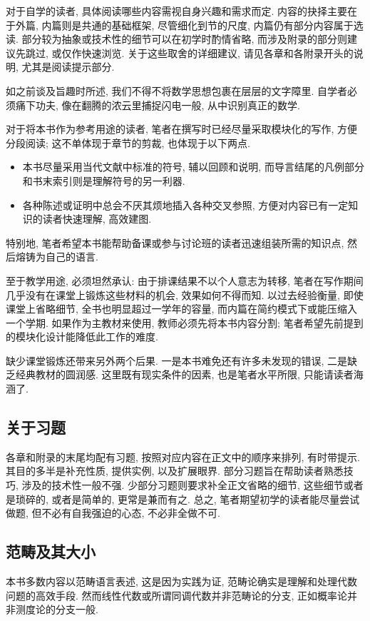 对于自学的读者, 具体阅读哪些内容需视自身兴趣和需求而定. 内容的抉择主要在于外篇, 内篇则是共通的基础框架, 尽管细化到节的尺度, 内篇仍有部分内容属于选读. 部分较为抽象或技术性的细节可以在初学时酌情省略, 而涉及附录的部分则建议先跳过, 或仅作快速浏览. 关于这些取舍的详细建议, 请见各章和各附录开头的说明, 尤其是阅读提示部分.

如之前谈及旨趣时所述, 我们不得不将数学思想包裹在层层的文字障里. 自学者必须痛下功夫, 像在翻腾的浓云里捕捉闪电一般, 从中识别真正的数学.

对于将本书作为参考用途的读者, 笔者在撰写时已经尽量采取模块化的写作, 方便分段阅读; 这不单体现于章节的剪裁, 也体现于以下两点.
\begin{itemize}
	\item 本书尽量采用当代文献中标准的符号, 辅以回顾和说明, 而导言结尾的凡例部分和书末索引则是理解符号的另一利器.
	\item 各种陈述或证明中总会不厌其烦地插入各种交叉参照, 方便对内容已有一定知识的读者快速理解, 高效建图.
\end{itemize}
特别地, 笔者希望本书能帮助备课或参与讨论班的读者迅速组装所需的知识点, 然后熔铸为自己的语言.

至于教学用途, 必须坦然承认: 由于排课结果不以个人意志为转移, 笔者在写作期间几乎没有在课堂上锻炼这些材料的机会, 效果如何不得而知. 以过去经验衡量, 即使课堂上省略细节, 全书也明显超过一学年的容量, 而内篇在简约模式下或能压缩入一个学期. 如果作为主教材来使用, 教师必须先将本书内容分割; 笔者希望先前提到的模块化设计能降低此工作的难度.

缺少课堂锻炼还带来另外两个后果. 一是本书难免还有许多未发现的错误, 二是缺乏经典教材的圆润感. 这里既有现实条件的因素, 也是笔者水平所限, 只能请读者海涵了.

\subsection*{关于习题}
各章和附录的末尾均配有习题, 按照对应内容在正文中的顺序来排列, 有时带提示. 其目的多半是补充性质, 提供实例, 以及扩展眼界. 部分习题旨在帮助读者熟悉技巧, 涉及的技术性一般不强. 少部分习题则要求补全正文省略的细节, 这些细节或者是琐碎的, 或者是简单的, 更常是兼而有之. 总之, 笔者期望初学的读者能尽量尝试做题, 但不必有自我强迫的心态, 不必非全做不可.

\subsection*{范畴及其大小}
本书多数内容以范畴语言表述, 这是因为实践为证, 范畴论确实是理解和处理代数问题的高效手段. 然而线性代数或所谓同调代数并非范畴论的分支, 正如概率论并非测度论的分支一般.

